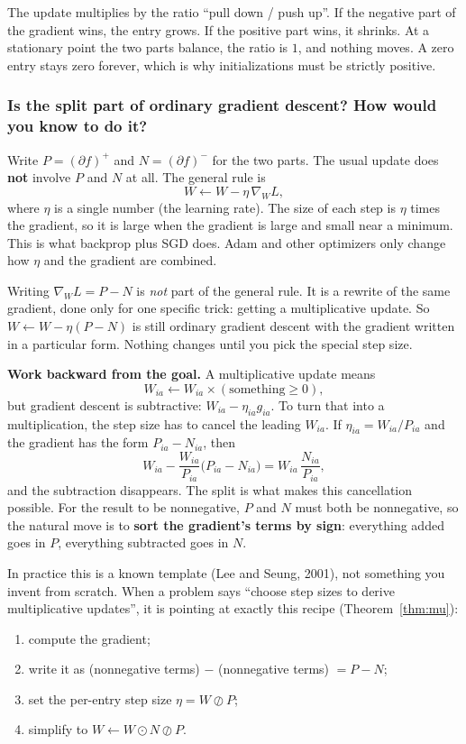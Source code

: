 \documentclass[11pt]{article}
\newcommand{\had}{\odot}
\newcommand{\hdiv}{\oslash}
\begin{document}
\begin{intuition}
The update multiplies by the ratio ``pull down / push up''. If the negative part of the
gradient wins, the entry grows. If the positive part wins, it shrinks. At a stationary
point the two parts balance, the ratio is $1$, and nothing moves. A zero entry stays
zero forever, which is why initializations must be strictly positive.
\end{intuition}

\subsubsection*{Is the split part of ordinary gradient descent? How would you know to do it?}

Write $P=(\partial f)^+$ and $N=(\partial f)^-$ for the two parts. The usual update does
\textbf{not} involve $P$ and $N$ at all. The general rule is
\[
W\leftarrow W-\eta\,\nabla_W L,
\]
where $\eta$ is a single number (the learning rate). The size of each step is $\eta$ times the
gradient, so it is large when the gradient is large and small near a minimum. This is what
backprop plus SGD does. Adam and other optimizers only change how $\eta$ and the gradient are combined.

Writing $\nabla_W L=P-N$ is \emph{not} part of the general rule. It is a rewrite of the same
gradient, done only for one specific trick: getting a multiplicative update. So
$W\leftarrow W-\eta(P-N)$ is still ordinary gradient descent with the gradient written in a
particular form. Nothing changes until you pick the special step size.

\textbf{Work backward from the goal.} A multiplicative update means
\[
W_{ia}\leftarrow W_{ia}\times(\text{something}\ge0),
\]
but gradient descent is subtractive: $W_{ia}-\eta_{ia}g_{ia}$. To turn that into a
multiplication, the step size has to cancel the leading $W_{ia}$. If $\eta_{ia}=W_{ia}/P_{ia}$ and
the gradient has the form $P_{ia}-N_{ia}$, then
\[
W_{ia}-\frac{W_{ia}}{P_{ia}}\big(P_{ia}-N_{ia}\big)=W_{ia}\,\frac{N_{ia}}{P_{ia}},
\]
and the subtraction disappears. The split is what makes this cancellation possible. For the result
to be nonnegative, $P$ and $N$ must both be nonnegative, so the natural move is to \textbf{sort the
gradient's terms by sign}: everything added goes in $P$, everything subtracted goes in $N$.

In practice this is a known template (Lee and Seung, 2001), not something you invent from
scratch. When a problem says ``choose step sizes to derive multiplicative updates'', it is pointing
at exactly this recipe (Theorem~\ref{thm:mu}):
\begin{enumerate}[nosep]
\item compute the gradient;
\item write it as (nonnegative terms) $-$ (nonnegative terms) $=P-N$;
\item set the per-entry step size $\eta=W\hdiv P$;
\item simplify to $W\leftarrow W\had N\hdiv P$.
\end{enumerate}
\end{document}
